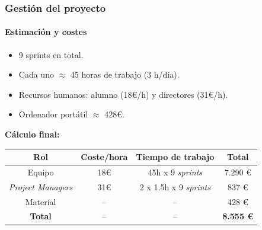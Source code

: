 \documentclass{beamer}
\begin{document}
\begin{frame}
\begin{columns}[T]
\begin{column}{0.8\textwidth}
\begin{description}[labelwidth=0.01mm]
\begin{itemize}
		 		\end{itemize}
		 	\end{description}
	 	\end{column}
	\end{columns}
\end{frame}
\begin{frame}
	\frametitle{Gestión del proyecto}
	\framesubtitle{Estimación y costes}
	\begin{itemize}
		\item 9 sprints en total. \pause
		\item Cada uno $\approx$ 45 horas de trabajo (3 h/día). \pause
		\item Recursos humanos: alumno (18€/h) y directores (31€/h).\pause
		\item Ordenador portátil $\approx$ 428€.
	\end{itemize}
	\pause
	\vspace{1cm}
\textbf{	Cálculo final:}
	\begin{table}[H]
		\centering
		{
			\setlength{\tabcolsep}{1\tabcolsep}
			\begin{tabular}{|c|c|c|c|}
				\hline
				\textbf{Rol} & \textbf{Coste/hora} & \textbf{Tiempo de trabajo} & \textbf{Total} \\ \hline
				Equipo & 18€ & 45h x 9 \textit{sprints} & 7.290 € \\ \hline
				\textit{Project Managers} & 31€ & 2 x 1.5h x 9 \textit{sprints} & 837 € \\ \hline
				Material & -- & -- & 428 € \\ \hline
				\textbf{Total} & -- & -- & \textbf{8.555 €} \\ \hline
				
			\end{tabular}%
		}
		\label{tab:metodologia/costes}
	\end{table}
	
	
\end{frame}
\end{document}
